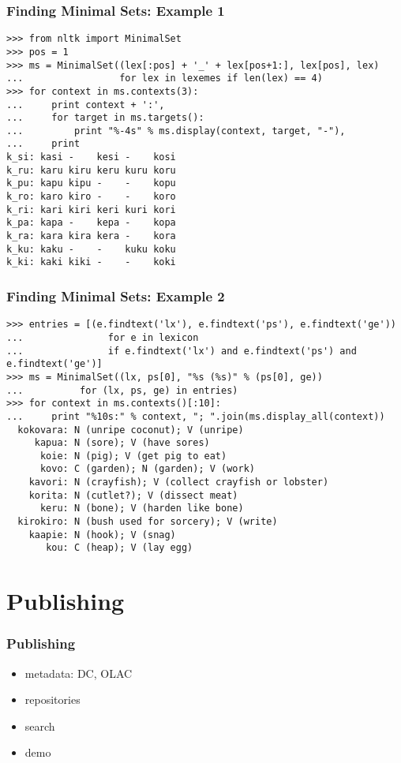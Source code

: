 \documentclass{beamer}             %
\begin{document}
\begin{frame}[fragile]
\frametitle{Finding Minimal Sets: Example 1}
\scriptsize

\begin{verbatim}
>>> from nltk import MinimalSet
>>> pos = 1
>>> ms = MinimalSet((lex[:pos] + '_' + lex[pos+1:], lex[pos], lex)
...                 for lex in lexemes if len(lex) == 4)
>>> for context in ms.contexts(3):
...     print context + ':',
...     for target in ms.targets():
...         print "%-4s" % ms.display(context, target, "-"),
...     print
k_si: kasi -    kesi -    kosi
k_ru: karu kiru keru kuru koru
k_pu: kapu kipu -    -    kopu
k_ro: karo kiro -    -    koro
k_ri: kari kiri keri kuri kori
k_pa: kapa -    kepa -    kopa
k_ra: kara kira kera -    kora
k_ku: kaku -    -    kuku koku
k_ki: kaki kiki -    -    koki
\end{verbatim}
\end{frame}

\begin{frame}[fragile]
\frametitle{Finding Minimal Sets: Example 2}
\scriptsize

\begin{verbatim}
>>> entries = [(e.findtext('lx'), e.findtext('ps'), e.findtext('ge'))
...               for e in lexicon
...               if e.findtext('lx') and e.findtext('ps') and e.findtext('ge')]
>>> ms = MinimalSet((lx, ps[0], "%s (%s)" % (ps[0], ge))
...          for (lx, ps, ge) in entries)
>>> for context in ms.contexts()[:10]:
...     print "%10s:" % context, "; ".join(ms.display_all(context))
  kokovara: N (unripe coconut); V (unripe)
     kapua: N (sore); V (have sores)
      koie: N (pig); V (get pig to eat)
      kovo: C (garden); N (garden); V (work)
    kavori: N (crayfish); V (collect crayfish or lobster)
    korita: N (cutlet?); V (dissect meat)
      keru: N (bone); V (harden like bone)
  kirokiro: N (bush used for sorcery); V (write)
    kaapie: N (hook); V (snag)
       kou: C (heap); V (lay egg)
\end{verbatim}
\end{frame}


\section{Publishing}

\begin{frame}
\frametitle{Publishing}

\begin{itemize}
\item metadata: DC, OLAC
\item repositories
\item search
\item demo
\end{itemize}

\end{frame}
\end{document}
